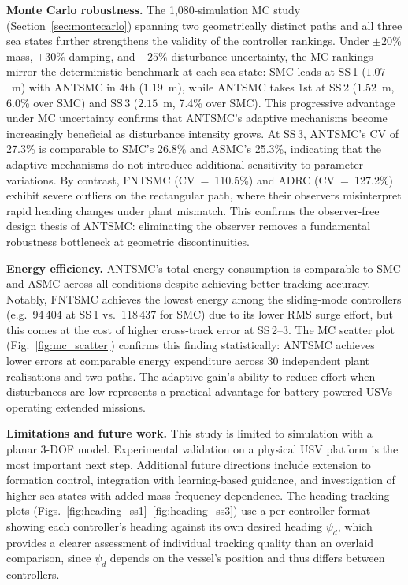 \documentclass[review]{cas-dc}
\begin{document}
\textbf{Monte Carlo robustness.} The 1{,}080-simulation MC study (Section~\ref{sec:montecarlo}) spanning two geometrically distinct paths and all three sea states further strengthens the validity of the controller rankings. Under $\pm 20\%$ mass, $\pm 30\%$ damping, and $\pm 25\%$ disturbance uncertainty, the MC rankings mirror the deterministic benchmark at each sea state: SMC leads at SS\,1 ($1.07$~m) with ANTSMC in 4th ($1.19$~m), while ANTSMC takes 1st at SS\,2 ($1.52$~m, 6.0\% over SMC) and SS\,3 ($2.15$~m, 7.4\% over SMC). This progressive advantage under MC uncertainty confirms that ANTSMC's adaptive mechanisms become increasingly beneficial as disturbance intensity grows. At SS\,3, ANTSMC's CV of 27.3\% is comparable to SMC's 26.8\% and ASMC's 25.3\%, indicating that the adaptive mechanisms do not introduce additional sensitivity to parameter variations. By contrast, FNTSMC (CV~=~110.5\%) and ADRC (CV~=~127.2\%) exhibit severe outliers on the rectangular path, where their observers misinterpret rapid heading changes under plant mismatch. This confirms the observer-free design thesis of ANTSMC: eliminating the observer removes a fundamental robustness bottleneck at geometric discontinuities.

\textbf{Energy efficiency.} ANTSMC's total energy consumption is comparable to SMC and ASMC across all conditions despite achieving better tracking accuracy. Notably, FNTSMC achieves the lowest energy among the sliding-mode controllers (e.g.\ 94\,404 at SS\,1 vs.\ 118\,437 for SMC) due to its lower RMS surge effort, but this comes at the cost of higher cross-track error at SS\,2--3. The MC scatter plot (Fig.~\ref{fig:mc_scatter}) confirms this finding statistically: ANTSMC achieves lower errors at comparable energy expenditure across 30 independent plant realisations and two paths. The adaptive gain's ability to reduce effort when disturbances are low represents a practical advantage for battery-powered USVs operating extended missions.

\textbf{Limitations and future work.} This study is limited to simulation with a planar 3-DOF model. Experimental validation on a physical USV platform is the most important next step. Additional future directions include extension to formation control, integration with learning-based guidance, and investigation of higher sea states with added-mass frequency dependence. The heading tracking plots (Figs.~\ref{fig:heading_ss1}--\ref{fig:heading_ss3}) use a per-controller format showing each controller's heading against its own desired heading $\psi_d$, which provides a clearer assessment of individual tracking quality than an overlaid comparison, since $\psi_d$ depends on the vessel's position and thus differs between controllers.
\end{document}
